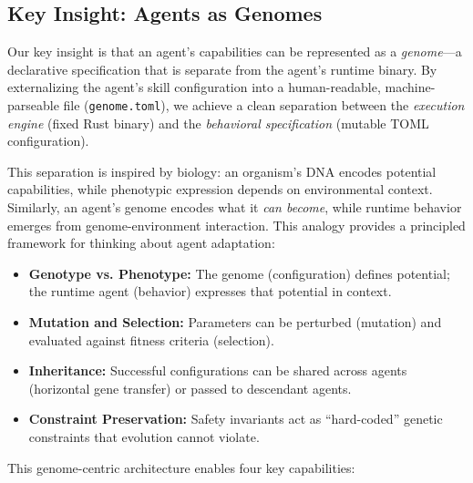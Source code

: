 \documentclass{article}
\newcommand{\genome}{\texttt{genome.toml}}
\begin{document}
\subsection{Key Insight: Agents as Genomes}

Our key insight is that an agent's capabilities can be represented as a \textit{genome}—a declarative specification that is separate from the agent's runtime binary. By externalizing the agent's skill configuration into a human-readable, machine-parseable file (\genome{}), we achieve a clean separation between the \textit{execution engine} (fixed Rust binary) and the \textit{behavioral specification} (mutable TOML configuration).

This separation is inspired by biology: an organism's DNA encodes potential capabilities, while phenotypic expression depends on environmental context. Similarly, an agent's genome encodes what it \textit{can become}, while runtime behavior emerges from genome-environment interaction. This analogy provides a principled framework for thinking about agent adaptation:

\begin{itemize}[leftmargin=*]
    \item \textbf{Genotype vs. Phenotype:} The genome (configuration) defines potential; the runtime agent (behavior) expresses that potential in context.
    \item \textbf{Mutation and Selection:} Parameters can be perturbed (mutation) and evaluated against fitness criteria (selection).
    \item \textbf{Inheritance:} Successful configurations can be shared across agents (horizontal gene transfer) or passed to descendant agents.
    \item \textbf{Constraint Preservation:} Safety invariants act as ``hard-coded'' genetic constraints that evolution cannot violate.
\end{itemize}

This genome-centric architecture enables four key capabilities:
\end{document}
